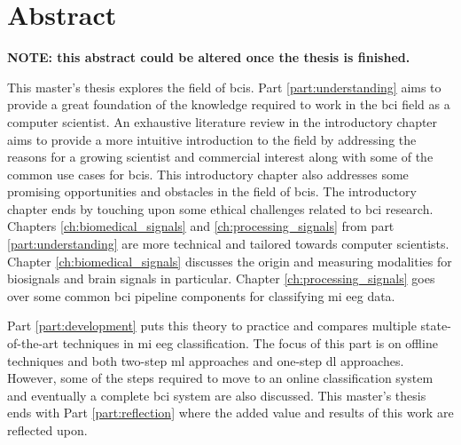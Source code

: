 
\chapter{Abstract}
\label{ch:abstract}

\textbf{NOTE: this abstract could be altered once the thesis is finished.}

This master's thesis explores the field of \glspl{bci}.
Part \ref{part:understanding} aims to provide a great foundation of the knowledge required to work in the \gls{bci} field as a computer scientist.
An exhaustive literature review in the introductory chapter aims to provide a more intuitive introduction to the field by addressing the reasons for a growing scientist and commercial interest along with some of the common use cases for \glspl{bci}.
This introductory chapter also addresses some promising opportunities and obstacles in the field of \glspl{bci}.
The introductory chapter ends by touching upon some ethical challenges related to \gls{bci} research.
Chapters \ref{ch:biomedical_signals} and \ref{ch:processing_signals} from part \ref{part:understanding} are more technical and tailored towards computer scientists.
Chapter \ref{ch:biomedical_signals} discusses the origin and measuring modalities for \glspl{biosignal} and brain signals in particular.
Chapter \ref{ch:processing_signals} goes over some common \gls{bci} pipeline components for classifying  \gls{mi} \gls{eeg} data.

Part \ref{part:development} puts this theory to practice and compares multiple state-of-the-art techniques in \gls{mi} \gls{eeg} classification.
The focus of this part is on offline techniques and both two-step \gls{ml} approaches and one-step \gls{dl} approaches.
However, some of the steps required to move to an online classification system and eventually a complete \gls{bci} system are also discussed.
This master's thesis ends with Part \ref{part:reflection} where the added value and results of this work are reflected upon.



